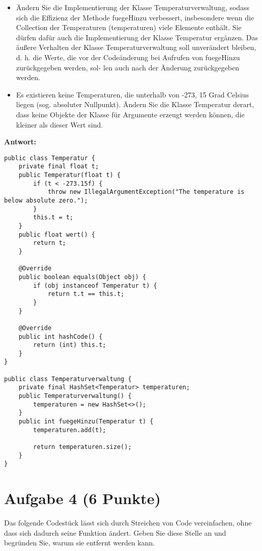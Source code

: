 \begin{itemize}
    \item Ändern Sie die Implementierung der Klasse Temperaturverwaltung, sodass sich die Effizienz
          der Methode fuegeHinzu verbessert, insbesondere wenn die Collection der Temperaturen
          (temperaturen) viele Elemente enthält. Sie dürfen dafür auch die Implementierung der
          Klasse Temperatur ergänzen.
          Das äußere Verhalten der Klasse Temperaturverwaltung soll unverändert bleiben, d. h. die
          Werte, die vor der Codeänderung bei Aufrufen von fuegeHinzu zurückgegeben werden, sol-
          len auch nach der Änderung zurückgegeben werden.
    \item Es existieren keine Temperaturen, die unterhalb von -273, 15 Grad Celsius
          liegen (sog. absoluter Nullpunkt). Ändern Sie die Klasse Temperatur derart,
          dass keine Objekte der Klasse für Argumente erzeugt werden können, die kleiner
          als dieser Wert sind.
\end{itemize}

\textbf{Antwort:}

\begin{lstlisting}
public class Temperatur {
    private final float t;
    public Temperatur(float t) {
        if (t < -273.15f) {
            throw new IllegalArgumentException("The temperature is below absolute zero.");
        }
        this.t = t;
    }
    public float wert() {
        return t;
    }

    @Override 
    public boolean equals(Object obj) {
        if (obj instanceof Temperatur t) {
            return t.t == this.t;
        }
    }

    @Override
    public int hashCode() {
        return (int) this.t;
    }
}

public class Temperaturverwaltung {
    private final HashSet<Temperatur> temperaturen;
    public Temperaturverwaltung() {
        temperaturen = new HashSet<>();
    }
    public int fuegeHinzu(Temperatur t) {
        temperaturen.add(t);

        return temperaturen.size();
    }
}
\end{lstlisting}

\section{Aufgabe 4 (6 Punkte)}

Das folgende Codestück lässt sich durch Streichen von Code vereinfachen, ohne
dass sich dadurch seine Funktion ändert. Geben Sie diese Stelle an und
begründen Sie, warum sie entfernt werden kann.

